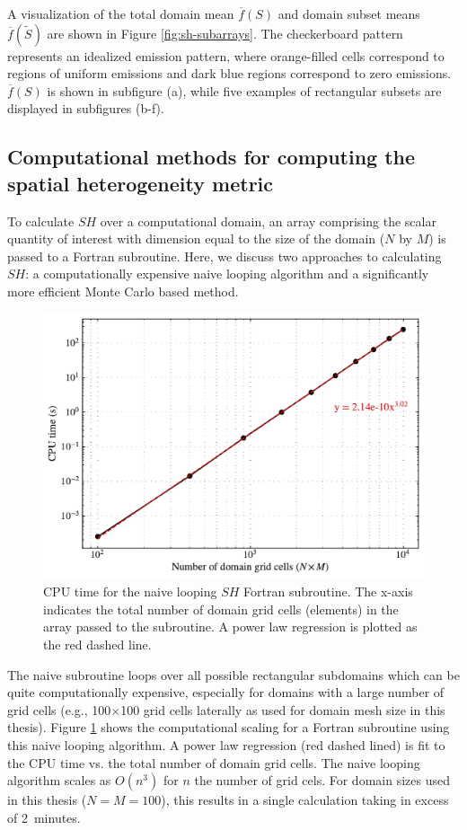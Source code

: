 A visualization of the total domain mean $\overline{f}(S)$ and domain subset means $\overline{f}(\tilde{S})$ are shown in Figure \ref{fig:sh-subarrays}. The checkerboard pattern represents an idealized emission pattern, where orange-filled cells correspond to regions of uniform emissions and dark blue regions correspond to zero emissions. $\overline{f}(S)$ is shown in subfigure (a), while five examples of rectangular subsets are displayed in subfigures (b-f).


\subsection{Computational methods for computing the spatial heterogeneity metric}\label{sh-metric-calculation}
To calculate $SH$ over a computational domain, an array comprising the scalar quantity of interest with dimension equal to the size of the domain ($N$ by $M$) is passed to a Fortran subroutine. Here, we discuss two approaches to calculating $SH$: a computationally expensive naive looping algorithm and a significantly more efficient Monte Carlo based method.

\begin{figure}[!t]
	\centering
	\includegraphics[width=\textwidth]{figures/chapter2/NSH-performance.pdf}
	\caption{CPU time for the naive looping $SH$ Fortran subroutine. The x-axis indicates the total number of domain grid cells (elements) in the array passed to the subroutine. A power law regression is plotted as the red dashed line.}
	\label{fig:nsh-performance}
\end{figure}

The naive subroutine loops over all possible rectangular subdomains which can be quite computationally expensive, especially for domains with a large number of grid cells (e.g., 100$\times$100 grid cells laterally as used for domain mesh size in this thesis). Figure \ref{fig:nsh-performance} shows the computational scaling for a Fortran subroutine using this naive looping algorithm. A power law regression (red dashed lined) is fit to the CPU time vs. the total number of domain grid cells. The naive looping algorithm scales as $O(n^3)$ for $n$ the number of grid cels. For domain sizes used in this thesis ($N=M=100$), this results in a single calculation taking in excess of 2~minutes.


